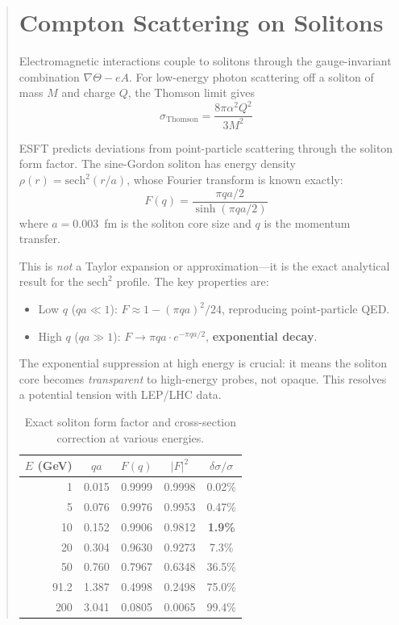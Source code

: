 ﻿\documentclass[twocolumn,prd,amsmath,amssymb,aps]{revtex4-2}
\begin{document}
\begin{abstract}
\section{Compton Scattering on Solitons}

Electromagnetic interactions couple to solitons through the gauge-invariant combination $\nabla\Theta - eA$. For low-energy photon scattering off a soliton of mass $M$ and charge $Q$, the Thomson limit gives
\begin{equation}
\sigma_{\text{Thomson}} = \frac{8\pi\alpha^2 Q^2}{3M^2}
\end{equation}

ESFT predicts deviations from point-particle scattering through the soliton form factor. The sine-Gordon soliton has energy density $\rho(r) = \text{sech}^2(r/a)$, whose Fourier transform is known exactly:
\begin{equation}
\boxed{F(q) = \frac{\pi q a/2}{\sinh(\pi q a/2)}}
\label{eq:exact_ff}
\end{equation}
where $a = 0.003$~fm is the soliton core size and $q$ is the momentum transfer.

This is \emph{not} a Taylor expansion or approximation---it is the exact analytical result for the $\text{sech}^2$ profile. The key properties are:
\begin{itemize}
\item Low $q$ ($qa \ll 1$): $F \approx 1 - (\pi qa)^2/24$, reproducing point-particle QED.
\item High $q$ ($qa \gg 1$): $F \to \pi qa \cdot e^{-\pi qa/2}$, \textbf{exponential decay}.
\end{itemize}

The exponential suppression at high energy is crucial: it means the soliton core becomes \emph{transparent} to high-energy probes, not opaque. This resolves a potential tension with LEP/LHC data.

\begin{table}[h]
\caption{Exact soliton form factor and cross-section correction at various energies.}
\label{tab:ff}
\begin{ruledtabular}
\begin{tabular}{rcccc}
$E$ (GeV) & $qa$ & $F(q)$ & $|F|^2$ & $\delta\sigma/\sigma$ \\
\hline
1 & 0.015 & 0.9999 & 0.9998 & 0.02\% \\
5 & 0.076 & 0.9976 & 0.9953 & 0.47\% \\
10 & 0.152 & 0.9906 & 0.9812 & \textbf{1.9\%} \\
20 & 0.304 & 0.9630 & 0.9273 & 7.3\% \\
50 & 0.760 & 0.7967 & 0.6348 & 36.5\% \\
91.2 & 1.387 & 0.4998 & 0.2498 & 75.0\% \\
200 & 3.041 & 0.0805 & 0.0065 & 99.4\% \\
\end{tabular}
\end{ruledtabular}
\end{table}


\end{abstract}
\end{document}
